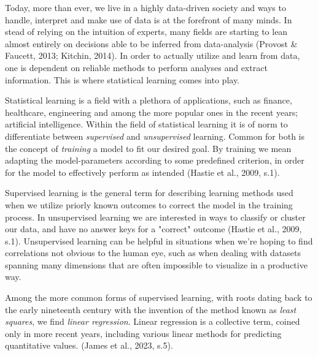 




Today, more than ever, we live in a highly data-driven society and ways to handle, interpret and make use of data is at the forefront of many minds. 
In stead of relying on the intuition of experts, many fields are starting to lean almost entirely on decisions able to be inferred from data-analysis (Provost \& Faucett, 2013; Kitchin, 2014). In order to actually utilize and learn from data, one is dependent on reliable methods to perform analyses and extract information. This is where statistical learning comes into play.

Statistical learning is a field with a plethora of applications, such as finance, healthcare, engineering and among the more popular ones in the recent years; artificial intelligence. 
Within the field of statistical learning it is of norm to differentiate between \textit{supervised} and \textit{unsupervised} learning. 
Common for both is the concept of \textit{training} a model to fit our desired goal. 
By training we mean adapting the model-parameters according to some predefined criterion, in order for the model to effectively perform as intended (Hastie et al., 2009, s.1).

Supervised learning is the general term for describing learning methods used when we utilize priorly known outcomes to correct the model in the training process. 
In unsupervised learning we are interested in ways to classify or cluster our data, and have no answer keys for a "correct" outcome (Hastie et al., 2009, s.1). 
Unsupervised learning can be helpful in situations when we're hoping to find correlations not obvious to the human eye, such as when dealing with datasets spanning many dimensions that are often impossible to visualize in a productive way.

Among the more common forms of supervised learning, with roots dating back to the early nineteenth century with the invention of the method known as \textit{least squares}, we find \textit{linear regression}. Linear regression is a collective term, coined only in more recent years, including various linear methods for predicting quantitative values.  (James et al., 2023, s.5).

